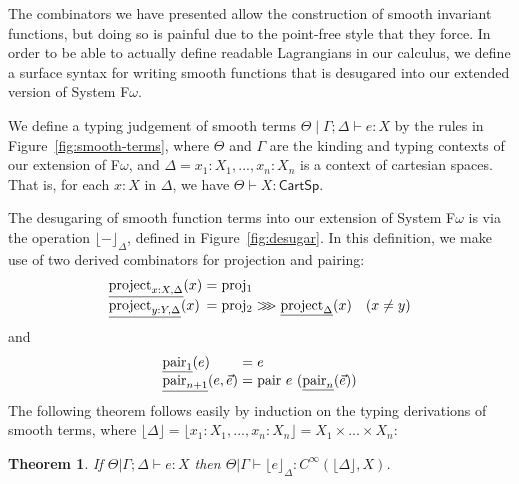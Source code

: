 \documentclass[preprint]{sigplanconf}
\newcommand{\sepbar}{\mathrel|}
\newtheorem{theorem}{Theorem}
\newcommand{\comp}{\mathrel{>\kern-0.45em>\kern-0.45em>}}
\newcommand{\elab}[1]{\lfloor #1 \rfloor}
\theoremstyle{examplestyle}
\begin{document}
The combinators we have presented allow the construction of smooth
invariant functions, but doing so is painful due to the point-free
style that they force. In order to be able to actually define readable
Lagrangians in our calculus, we define a surface syntax for writing
smooth functions that is desugared into our extended version of System
F$\omega$.

We define a typing judgement of smooth terms $\Theta \sepbar \Gamma;
\Delta \vdash e : X$ by the rules in Figure~\ref{fig:smooth-terms},
where $\Theta$ and $\Gamma$ are the kinding and typing contexts of our
extension of F$\omega$, and $\Delta = x_1 : X_1, ..., x_n : X_n$ is a
context of cartesian spaces. That is, for each $x : X$ in $\Delta$, we
have $\Theta \vdash X : \mathsf{CartSp}$.

The desugaring of smooth function terms into our extension of System
F$\omega$ is via the operation $\elab{-}_\Delta$, defined in
Figure~\ref{fig:desugar}. In this definition, we make use of two
derived combinators for projection and pairing:
\begin{displaymath}
  \begin{array}{l@{\hspace{0.3em}}c@{\hspace{0.3em}}l}
    \underline{\mathrm{project}_{x : X, \Delta}}(x) & = & \mathrm{proj_1} \\
    \underline{\mathrm{project}_{y : Y, \Delta}}(x) & = & \mathrm{proj_2} \comp \underline{\mathrm{project}_\Delta}(x) \quad (x \not= y)
  \end{array}
\end{displaymath}
and
\begin{displaymath}
  \begin{array}{l@{\hspace{0.3em}}c@{\hspace{0.3em}}l}
    \underline{\mathrm{pair}_1}(e) & = & e \\
    \underline{\mathrm{pair}_{n+1}}(e, \vec{e}) & = & \mathrm{pair}~e~(\underline{\mathrm{pair}_n}(\vec{e}))
  \end{array}
\end{displaymath}
The following theorem follows easily by induction on the typing
derivations of smooth terms, where $\elab{\Delta} = \elab{x_1 : X_1,
  ..., x_n : X_n} = X_1 \times ... \times X_n$:
\begin{theorem}
  If $\Theta |\Gamma; \Delta \vdash e : X$ then $\Theta |
  \Gamma \vdash \elab{e}_\Delta : C^\infty(\elab{\Delta}, X)$.
\end{theorem}
\end{document}
